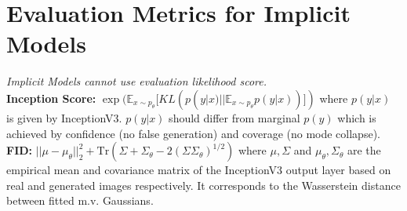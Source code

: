\section*{Evaluation Metrics for Implicit Models}
\textit{Implicit Models cannot use evaluation likelihood score.}\\
\textbf{Inception Score:} $\exp(\mathbb E_{x \sim p_\theta} [KL(p(y|x)||\mathbb{E}_{x \sim p_\theta} p(y|x))])$ where $p(y|x)$ is given by InceptionV3. $p(y|x)$ should differ from marginal $p(y)$ which is achieved by confidence (no false generation) and coverage (no mode collapse).\\
\textbf{FID:} $||\mu - \mu_\theta||_2^2 + \text{Tr}(\Sigma + \Sigma_\theta - 2 (\Sigma \Sigma_\theta)^{1/2})$ where $\mu, \Sigma$ and $\mu_\theta, \Sigma_\theta$ are the empirical mean and covariance matrix of the InceptionV3 output layer based on real and generated images respectively. It corresponds to the Wasserstein distance between fitted m.v. Gaussians.